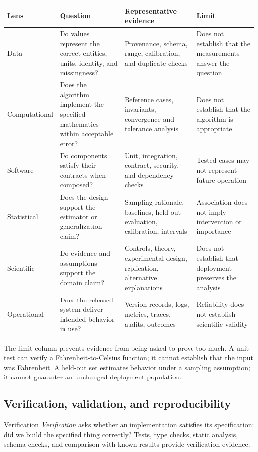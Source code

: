 \begin{longtable}{@{}
  >{\raggedright\arraybackslash}p{}
  >{\raggedright\arraybackslash}p{}
  >{\raggedright\arraybackslash}p{}
  >{\raggedright\arraybackslash}p{}@{}}
\toprule
\textbf{Lens} & \textbf{Question} & \textbf{Representative evidence} &
\textbf{Limit} \\
\midrule
\endhead
Data & Do values represent the correct entities, units, identity, and
missingness? & Provenance, schema, range, calibration, and duplicate checks &
Does not establish that the measurements answer the question \\
Computational & Does the algorithm implement the specified mathematics within
acceptable error? & Reference cases, invariants, convergence and tolerance
analysis & Does not establish that the algorithm is appropriate \\
Software & Do components satisfy their contracts when composed? & Unit,
integration, contract, security, and dependency checks & Tested cases may not
represent future operation \\
Statistical & Does the design support the estimator or generalization claim? &
Sampling rationale, baselines, held-out evaluation, calibration, intervals &
Association does not imply intervention or importance \\
Scientific & Do evidence and assumptions support the domain claim? & Controls,
theory, experimental design, replication, alternative explanations & Does not
establish that deployment preserves the analysis \\
Operational & Does the released system deliver intended behavior in use? &
Version records, logs, metrics, traces, audits, outcomes & Reliability does not
establish scientific validity \\
\bottomrule
\end{longtable}

The limit column prevents evidence from being asked to prove too much. A unit
test can verify a Fahrenheit-to-Celsius function; it cannot establish that the
input was Fahrenheit. A held-out set estimates behavior under a sampling
assumption; it cannot guarantee an unchanged deployment population.

\subsection{Verification, validation, and reproducibility}

\begin{definitionbox}{Verification}
\emph{Verification} asks whether an implementation satisfies its specification:
did we build the specified thing correctly? Tests, type checks, static analysis,
schema checks, and comparison with known results provide verification evidence.
\end{definitionbox}

